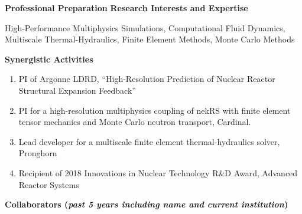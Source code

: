 \documentclass[11pt,letterpaper,english]{article}
\begin{document}
\begin{flushleft} {\bf Professional Preparation}
\vspace{-6pt}
{\bf Research Interests and Expertise}
{\parindent 16pt

High-Performance Multiphysics Simulations,
Computational Fluid Dynamics,
Multiscale Thermal-Hydraulics,
Finite Element Methods,
Monte Carlo Methods
}

\vspace{.04in}
{\bf Synergistic Activities}
\vspace{-6pt}
\begin{enumerate} \itemsep1pt \parskip0pt 

\item PI of Argonne LDRD, ``High-Resolution Prediction of Nuclear Reactor Structural Expansion Feedback''
\item PI for a high-resolution multiphysics coupling of nekRS with finite element tensor mechanics and Monte Carlo neutron transport, Cardinal.
\item Lead developer for a multiscale finite element thermal-hydraulics solver, Pronghorn
\item Recipient of 2018 Innovations in Nuclear Technology R\&D Award, Advanced Reactor Systems
\end{enumerate}

\vspace{-6pt}
{\bf Collaborators ({\emph{past 5 years including name and current institution}})}
{\parindent 16pt

}
\end{flushleft}
\end{document}
